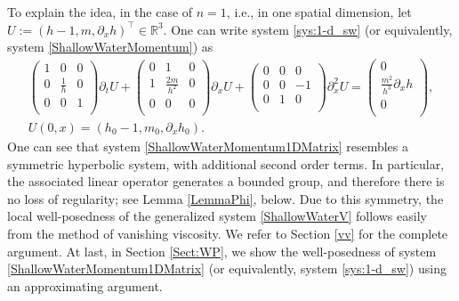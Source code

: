 \documentclass[reqno,11pt]{amsart}
\theoremstyle{plain}
\theoremstyle{definition}
\numberwithin{equation}{section}
\begin{document}
\smallskip 

To explain the idea, in the case of $ n = 1 $, i.e., in one spatial dimension, let $ U:= (h-1, m, \partial_x h)^\top \in \mathbb R^3 $. One can write system \eqref{sys:1-d_sw} (or equivalently, system \eqref{ShallowWaterMomentum}) as
\begin{subequations}
\label{ShallowWaterMomentum1DMatrix}
    \begin{gather}
    \begin{pmatrix}
        1 & 0 & 0 \\
        0 & \frac{1}{h} & 0 \\
        0 & 0 & 1 \\
    \end{pmatrix}\partial_t U+\begin{pmatrix}
        0 & 1 & 0 \\
        1 & \frac{2m}{h^2} & 0 \\
        0 & 0 & 0 \\
    \end{pmatrix}\partial_x U+\begin{pmatrix}
        0 & 0 & 0 \\
        0 & 0 & -1 \\
        0 & 1 & 0 \\
    \end{pmatrix}\partial_x^2 U=\begin{pmatrix}
        0 \\
        \frac{m^2}{h^3}\partial_x h \\
        0 \\
    \end{pmatrix}, \\
    U(0,x)=(h_0-1,m_0,\partial_x h_0).
\end{gather}
\end{subequations}
One can see that system \eqref{ShallowWaterMomentum1DMatrix} resembles a symmetric hyperbolic system, with additional second order terms. In particular, the associated linear operator generates a bounded group, and therefore there is no loss of regularity; see Lemma \ref{LemmaPhi}, below. Due to this symmetry, the local well-posedness of the generalized system \eqref{ShallowWaterV} follows easily from the method of vanishing viscosity. We refer to Section \ref{vv} for the complete argument. At last, in Section \ref{Sect:WP}, we show the well-posedness of system \eqref{ShallowWaterMomentum1DMatrix} (or equivalently, system \eqref{sys:1-d_sw}) using an approximating argument.
\end{document}
